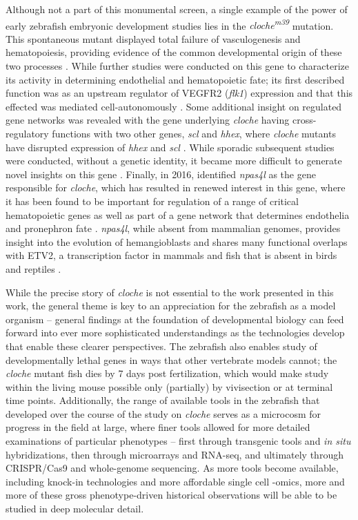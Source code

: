 Although not a part of this monumental screen, a single example of the power of early zebrafish embryonic development studies lies in the \textit{cloche\textsuperscript{m39}} mutation. This spontaneous mutant displayed total failure of vasculogenesis and hematopoiesis, providing evidence of the common developmental origin of these two processes \citep{Stainier1995}. While further studies were conducted on this gene to characterize its activity in determining endothelial and hematopoietic fate; its first described function was as an upstream regulator of VEGFR2 (\textit{flk1}) expression and that this effected was mediated cell-autonomously \citep{Liao1997, Parker1999}. Some additional insight on regulated gene networks was revealed with the gene underlying \textit{cloche} having cross-regulatory functions with two other genes, \textit{scl} and \textit{hhex}, where \textit{cloche} mutants have disrupted expression of \textit{hhex} and \textit{scl} \citep{Liao2000}. While sporadic subsequent studies were conducted, without a genetic identity, it became more difficult to generate novel insights on this gene \citep{Qian2005}. Finally, in 2016, \citeauthor{Reischauer2016} identified \textit{npas4l} as the gene responsible for \textit{cloche}, which has resulted in renewed interest in this gene, where it has been found to be important for regulation of a range of critical hematopoietic genes \citep{Marass2019} as well as part of a gene network that determines endothelia and pronephron fate \citep{Mattonet2022}. \textit{npas4l}, while absent from mammalian genomes, provides insight into the evolution of hemangioblasts and shares many functional overlaps with ETV2, a transcription factor in mammals and fish that is absent in birds and reptiles \citep{Weng2020}.

While the precise story of \textit{cloche} is not essential to the work presented in this work, the general theme is key to an appreciation for the zebrafish as a model organism -- general findings at the foundation of developmental biology can feed forward into ever more sophisticated understandings as the technologies develop that enable these clearer perspectives. The zebrafish also enables study of developmentally lethal genes in ways that other vertebrate models cannot; the \textit{cloche} mutant fish dies by 7 days post fertilization, which would make study within the living mouse possible only (partially) by vivisection or at terminal time points. Additionally, the range of available tools in the zebrafish that developed over the course of the study on \textit{cloche} serves as a microcosm for progress in the field at large, where finer tools allowed for more detailed examinations of particular phenotypes -- first through transgenic tools and \textit{in situ} hybridizations, then through microarrays and RNA-seq, and ultimately through CRISPR/Cas9 and whole-genome sequencing. As more tools become available, including knock-in technologies and more affordable single cell -omics, more and more of these gross phenotype-driven historical observations will be able to be studied in deep molecular detail. 

